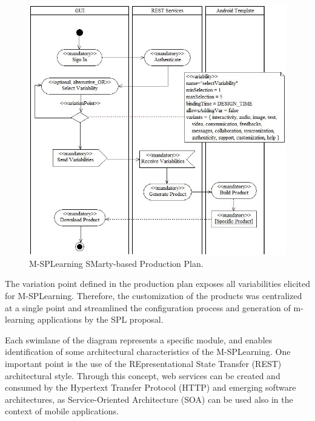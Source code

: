 \begin{figure}
\centering
\includegraphics[scale=0.4]{figures/section3/MSPLProductionPlan}
\caption{M-SPLearning SMarty-based Production Plan.}
\label{figureMSPLProductionPlan}
\end{figure}

The variation point defined in the production plan exposes all variabilities elicited for M-SPLearning. Therefore, the customization of the products was centralized at a single point and streamlined the configuration process and generation of m-learning applications by the SPL proposal.

Each swimlane of the diagram represents a specific module, and enables identification of some architectural characteristics of the M-SPLearning. One important point is the use of the REpresentational State Transfer (REST) \cite{fielding00} architectural style. Through this concept, web services can be created and consumed by the Hypertext Transfer Protocol (HTTP) and emerging software architectures, as Service-Oriented Architecture (SOA) can be used also in the context of mobile applications.

